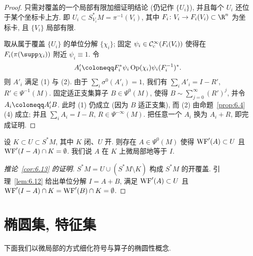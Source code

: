 \begin{proof}
只需对覆盖的一个局部有限加细证明结论 (仍记作 $\{U_i\}$), 并且每个 $U_i$ 还位于某个坐标卡上方. 即 $U_i \subset S^*_{V_i} M = \pi^{-1}(V_i)$, 其中 $F_i \colon V_i \to F_i(V_i) \subset \R^n$ 为坐标卡, 且 $\{V_i\}$ 局部有限.

取从属于覆盖 $\{U_i\}$ 的单位分解 $\{\chi_i\}$; 固定 $\psi_i \in \mathcal{C}_{\mathrm{c}}^\infty(F_i(V_i))$ 使得在 $F_i(\pi(\supp \chi_i))$ 附近 $\psi_i \equiv 1$. 令
\begin{equation}\label{eq:6.10}
    A'_i \defeq F_i^* \psi_i \Op(\chi_i) \psi_i (F_i^{-1})^*.
\end{equation}
则 $A'_i$ 满足 (1) 与 (2). 由于 $\sum_i \sigma^0(A'_i) = 1$, 我们有 $\sum_i A'_i = I - R'$, $R' \in \Psi^{-1}(M)$. 固定适正支集算子 $B \in \Psi^0(M)$, 使得 $B \sim \sum_{j=0}^\infty (R')^j$, 并令 $A_i \defeq A'_i B$. 此时 (1) 仍成立 (因为 $B$ 适正支集), 而 (2) 由命题~\ref{prop:6.4}(4) 成立; 并且 $\sum_i A_i = I - R$, $R \in \Psi^{-\infty}(M)$. 把任意一个 $A_i$ 换为 $A_i + R$, 即完成证明.
\end{proof}

\begin{corollary}[微局部化算子]\label{cor:6.13}
设 $K \subset U \subset S^* M$, 其中 $K$ 闭、$U$ 开. 则存在 $A \in \Psi^0(M)$ 使得 $\operatorname{WF}'(A) \subset U$ 且 $\operatorname{WF}'(I - A) \cap K = \emptyset$. 我们说 $A$ 在 $K$ 上微局部地等于 $I$.
\end{corollary}

\begin{proof}[推论~\ref{cor:6.13} 的证明]
$S^* M = U \cup (S^* M \setminus K)$ 构成 $S^* M$ 的开覆盖. 引理~\ref{lem:6.12} 给出单位分解 $I = A + B$, 满足 $\operatorname{WF}'(A) \subset U$ 且 $\operatorname{WF}'(I - A) \cap K = \operatorname{WF}'(B) \cap K = \emptyset$.
\end{proof}



\section{椭圆集, 特征集}\label{sec:6.2}
%
%

下面我们以微局部的方式细化符号与算子的椭圆性概念.

